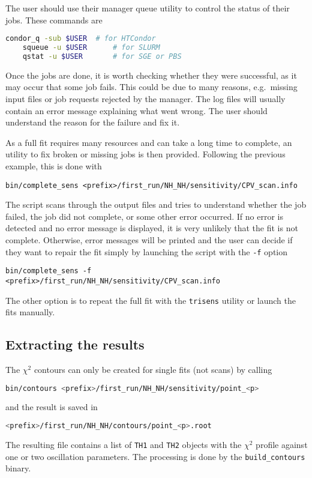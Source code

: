 \documentclass[a4paper, 11pt]{article}
\begin{document}
The user should use their manager queue utility to control the status of their jobs.
These commands are
\begin{lstlisting}[language=bash]
    condor_q -sub $USER  # for HTCondor
    squeue -u $USER      # for SLURM
    qstat -u $USER       # for SGE or PBS
\end{lstlisting}
Once the jobs are done, it is worth checking whether they were successful, %
as it may occur that some job fails.
This could be due to many reasons, e.g.\ missing input files or job requests rejected by the manager.
The log files will usually contain an error message explaining what went wrong.
The user should understand the reason for the failure and fix it.

As a full fit requires many resources and can take a long time to complete, %
an utility to fix broken or missing jobs is then provided.
Following the previous example, this is done with
\begin{lstlisting}[]
    bin/complete_sens <prefix>/first_run/NH_NH/sensitivity/CPV_scan.info
\end{lstlisting}
The script scans through the output files and tries to understand whether the job failed, %
the job did not complete, or some other error occurred.
If no error is detected and no error message is displayed, it is very unlikely that the fit %
is not complete.
Otherwise, error messages will be printed and the user can decide if they want to repair the fit %
simply by launching the script with the \texttt{-f} option
\begin{lstlisting}[]
    bin/complete_sens -f <prefix>/first_run/NH_NH/sensitivity/CPV_scan.info
\end{lstlisting}
The other option is to repeat the full fit with the \texttt{trisens} utility %
or launch the fits manually.

\subsection{Extracting the results}

The $\chi^2$ contours can only be created for single fits (not scans) by calling
\begin{lstlisting}[language=bash]
    bin/contours <prefix>/first_run/NH_NH/sensitivity/point_<p>
\end{lstlisting}
and the result is saved in 
\begin{lstlisting}[language=bash]
    <prefix>/first_run/NH_NH/contours/point_<p>.root
\end{lstlisting}
The resulting file contains a list of \texttt{TH1} and \texttt{TH2} objects with the %
$\chi^2$ profile against one or two oscillation parameters.
The processing is done by the \texttt{build\_contours} binary.
\end{document}
